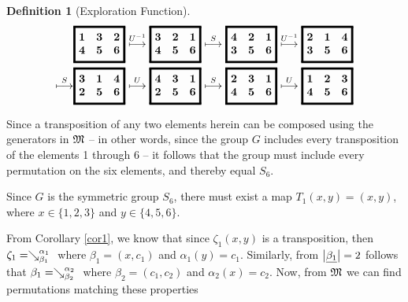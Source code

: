 \documentclass[a4paper,twoside,12pt,openany]{report}
\theoremstyle{plain}
\theoremstyle{definition}
\newtheorem{definition}{Definition}
\theoremstyle{remark}
\begin{document}
\begin{definition}[Exploration Function]
\begin{align*}
	& \gameboard[1 3 2 4 5 6]
	\overset{U\inv}\gamemovearrow
	\gameboard[3 2 1 4 5 6]
	\overset{S}\gamemovearrow
	\gameboard[4 2 1 3 5 6]
	\overset{U\inv}\gamemovearrow
	\gameboard[2 1 4 3 5 6] \\
	\overset{S}\gamemovearrow
	& \gameboard[3 1 4 2 5 6]
	\overset{U}\gamemovearrow
	\gameboard[4 3 1 2 5 6]
	\overset{S}\gamemovearrow
	\gameboard[2 3 1 4 5 6]
	\overset{U}\gamemovearrow
	\gameboard[1 2 3 4 5 6]
\end{align*}

Since a transposition of any two elements herein can be composed using the generators in \(\mathfrak{M}\) -- in other words, since the group \(G\) includes every transposition of the elements 1 through 6 -- it follows that the group must include every permutation on the six elements, and thereby equal \(S_6\).

\color{orange}
Since \(G\) is the symmetric group \(S_6\), there must exist a map
\(T_1(x,y)=(x,y)\), where \(x\in\{1,2,3\}\) and \(y\in\{4,5,6\}\).

From Corollary \ref{cor1}, we know that since \(\zeta_1(x,y)\) is a transposition, then \(\zeta_1=\searrow^{\alpha_1}_{\beta_1}\ \) where \(\beta_1=\left(x,c_1\right)\) and \(\alpha_1(y)=c_1\). Similarly, from \(\left|\underline{\beta_1}\right|=2\) follows that \(\beta_1=\searrow^{\alpha_2}_{\beta_2}\ \) where \(\beta_2=\left(c_1,c_2\right)\) and \(\alpha_2(x)=c_2\). Now, from \(\mathfrak{M}\) we can find permutations matching these properties


\end{definition}
\end{document}
